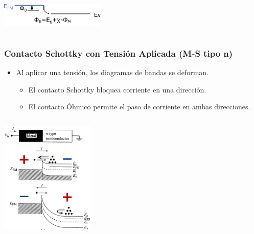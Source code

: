 \documentclass[10pt,t,aspectratio=169]{beamer}
\begin{document}
\begin{frame}[t]
\begin{columns}
\begin{column}{0.5\textwidth}
            \vspace{5mm}
            \centering
            \includegraphics[width=5cm]{./figures/contactos-caso4b.pdf}
            
        \end{column}
        
    \end{columns}
    
\end{frame}


\begin{frame}[t]
    \frametitle{Contacto Schottky con Tensión Aplicada (M-S tipo n)}

    \begin{itemize}
        \item Al aplicar una tensión, los diagramas de bandas se deforman.
        \begin{itemize}
            \item El contacto Schottky bloquea corriente en una dirección.
            \item El contacto Óhmico permite el paso de corriente en ambas direcciones.
        \end{itemize}
    \end{itemize}

    \begin{columns}
    
        \begin{column}{0.4\textwidth}
        
            \centering
            \includegraphics[width=4.5cm]{./figures/contacto-schottky-con-VA.pdf}
            
        \end{column}
        
        \begin{column}{0.6\textwidth}
        

\end{column}
\end{columns}
\end{frame}
\end{document}
